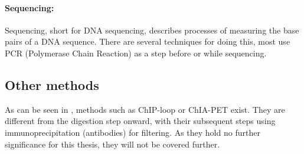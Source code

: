 \paragraph{Sequencing:}\label{sec:sequencing}
Sequencing, short for DNA sequencing, describes processes of measuring the base
pairs of a DNA sequence. There are several techniques for doing this, most use
PCR (Polymerase Chain Reaction) as a step before or while sequencing.







\subsection{Other methods}\label{sec:other3c}

As can be seen in , methods such as ChIP-loop or ChIA-PET
exist. They are different from the digestion step onward, with their
subsequent steps using immunoprecipitation (antibodies) for filtering. As they
hold no further significance for this thesis, they will not be covered further.


